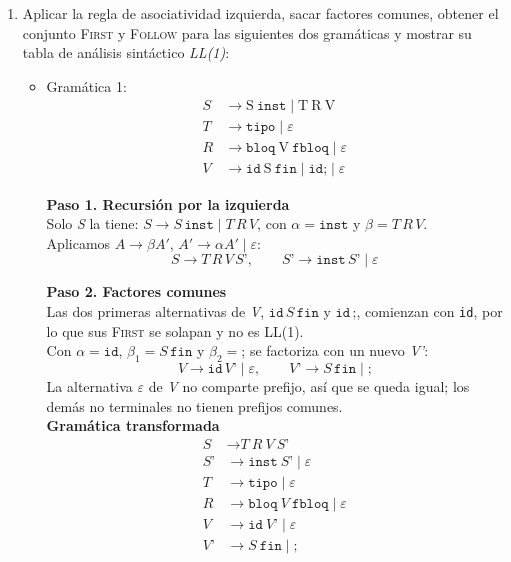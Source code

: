 \documentclass[12pt,letterpaper]{article}
\newcommand{\nt}[1]{\textit{#1}}
\newcommand{\tk}[1]{\texttt{#1}}
\newcommand{\tx}[1]{\text{#1}}
\newcommand{\First}[1]{\mathrm{FIRST}(#1)}
\newcommand{\Follow}[1]{\mathrm{FOLLOW}(#1)}
\newcommand{\eps}{\varepsilon}
\begin{document}
\begin{enumerate}[label=\arabic*.]
  Para \nt{Var-list'}: $\First{\tk{,}\,\nt{Var-list}}=\{\tk{,}\}$ y $\Follow{\nt{Var-list'}}=\{\tk{\$}\}$
  son disjuntos, así que ya no hay conflicto y con esto, \textbf{la gramática factorizada es LL(1)}.

  
\newpage


\item Aplicar la regla de asociatividad izquierda, sacar factores comunes, obtener el conjunto \textsc{First} y
  \textsc{Follow} para las siguientes dos gramáticas y mostrar su tabla de análisis sintáctico \nt{LL(1)}:
  
  \begin{itemize}
  \item Gramática 1:
    \[
    \begin{aligned}
      \nt{S} &\to \tx{S}\ \tk{inst} \mid \tx{T}\ \tx{R}\ \tx{V} \\
      \nt{T} &\to \tk{tipo} \mid \eps \\
      \nt{R} &\to \tk{bloq}\ \tx{V}\ \tk{fbloq} \mid \eps \\
      \nt{V} &\to \tk{id}\ \tx{S}\ \tk{fin} \mid \tk{id}\tk{;} \mid \eps
    \end{aligned}
    \]

    \bigskip

    \textbf{Paso 1. Recursión por la izquierda}\\
    Solo \nt{S} la tiene: $\nt{S}\to\nt{S}\,\tk{inst}\mid\nt{T}\,\nt{R}\,\nt{V}$, con $\alpha=\tk{inst}$ y
    $\beta=\nt{T}\,\nt{R}\,\nt{V}$.\\
    Aplicamos $A\to\beta A'$, $A'\to\alpha A'\mid\eps$:
    \[
    \nt{S}\to\nt{T}\,\nt{R}\,\nt{V}\,\nt{S'},\qquad \nt{S'}\to\tk{inst}\,\nt{S'}\mid\eps
    \]

    \textbf{Paso 2. Factores comunes}\\
    Las dos primeras alternativas de \nt{V}, $\tk{id}\,\nt{S}\,\tk{fin}$ y $\tk{id}\,\tk{;}$, comienzan con
    \tk{id}, por lo que sus \textsc{First} se solapan y no es LL(1).\\
    Con $\alpha=\tk{id}$, $\beta_1=\nt{S}\,\tk{fin}$ y $\beta_2=\tk{;}$ se factoriza con un nuevo \nt{V'}:
    \[
    \nt{V}\to\tk{id}\,\nt{V'}\mid\eps,\qquad
    \nt{V'}\to\nt{S}\,\tk{fin}\mid\tk{;}
    \]
    La alternativa $\eps$ de \nt{V} no comparte prefijo, así que se queda igual; los demás no terminales no
    tienen prefijos comunes.\\

    \textbf{Gramática transformada}
    \[
    \begin{aligned}
      \nt{S}  &\to \nt{T}\ \nt{R}\ \nt{V}\ \nt{S'} \\
      \nt{S'} &\to \tk{inst}\ \nt{S'} \mid \eps \\
      \nt{T}  &\to \tk{tipo} \mid \eps \\
      \nt{R}  &\to \tk{bloq}\ \nt{V}\ \tk{fbloq} \mid \eps \\
      \nt{V}  &\to \tk{id}\ \nt{V'} \mid \eps \\
      \nt{V'} &\to \nt{S}\ \tk{fin} \mid \tk{;}
    \end{aligned}
    \]


\end{itemize}
\end{enumerate}
\end{document}
